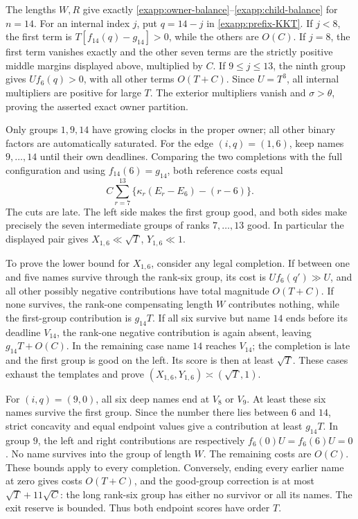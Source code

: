 The lengths \(W,R\) give exactly
\eqref{exapp:owner-balance}--\eqref{exapp:child-balance} for \(n=14\).
For an internal index \(j\), put \(q=14-j\) in
\eqref{exapp:prefix-KKT}.  If \(j<8\), the first term is
\(T[f_{14}(q)-g_{14}]>0\), while the others are \(O(C)\).
If \(j=8\), the first term vanishes exactly and the other seven
terms are the strictly positive middle margins displayed above,
multiplied by \(C\).  If \(9\le j\le13\), the ninth group gives
\(Uf_6(q)>0\), with all other terms \(O(T+C)\).
Since \(U=T^3\), all internal multipliers are positive for large
\(T\).  The exterior multipliers vanish and \(\sigma>\theta\),
proving the asserted exact owner partition.

Only groups \(1,9,14\) have growing clocks in the proper owner;
all other binary factors are automatically saturated.  For the edge
\((i,q)=(1,6)\), keep names \(9,\ldots,14\) until their own
deadlines.  Comparing the two completions with the full configuration
and using \(f_{14}(6)=g_{14}\), both reference costs equal
\[
 C\sum_{r=7}^{13}\{\kappa_r(E_r-E_6)-(r-6)\}.
\]
The cuts are late.  The left side makes the first group good, and
both sides make precisely the seven intermediate groups of ranks
\(7,\ldots,13\) good.  In particular the displayed pair gives
\(X_{1,6}\ll\sqrt T\), \(Y_{1,6}\ll1\).

To prove the lower bound for \(X_{1,6}\), consider any legal
completion.  If between one and five names survive through the
rank-six group, its cost is \(Uf_6(q')\gg U\), and all other
possibly negative contributions have total magnitude \(O(T+C)\).
If none survives, the rank-one compensating length \(W\) contributes
nothing, while the first-group contribution is \(g_{14}T\).
If all six survive but name \(14\) ends before its deadline
\(V_{14}\), the rank-one negative contribution is again absent,
leaving \(g_{14}T+O(C)\).  In the remaining case name \(14\)
reaches \(V_{14}\); the completion is late and the first group is
good on the left.  Its score is then at least \(\sqrt T\).
These cases exhaust the templates and prove
\((X_{1,6},Y_{1,6})\asymp(\sqrt T,1)\).

For \((i,q)=(9,0)\), all six deep names end at \(V_8\) or \(V_9\).
At least these six names survive the first group.  Since the number
there lies between \(6\) and \(14\), strict concavity and equal
endpoint values give a contribution at least \(g_{14}T\).  In
group \(9\), the left and right contributions are respectively
\(f_6(0)U=f_6(6)U=0\).  No name survives into the group of length
\(W\).  The remaining costs are \(O(C)\).  These bounds apply to
every completion.  Conversely, ending every earlier name at zero
gives costs \(O(T+C)\), and the good-group correction is at most
\(\sqrt T+11\sqrt C\): the long rank-six group has either no
survivor or all its names.  The exit reserve is bounded.
Thus both endpoint scores have order \(T\).

